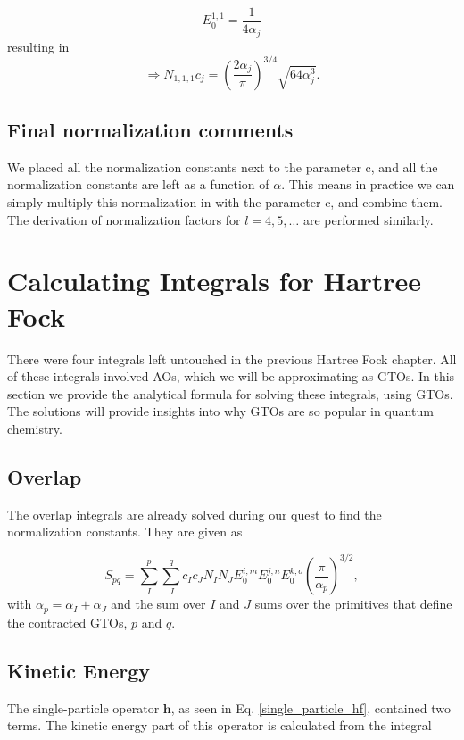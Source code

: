 \documentclass[a4paper,norsk,11pt,twoside]{report}
\begin{document}
\begin{equation}
E_0^{1,1} = \frac{1}{4\alpha_j}  
\end{equation}
resulting in
\begin{equation}
\Rightarrow N_{1,1,1} c_j = \left( \frac{2\alpha_j}{\pi} \right)^{3/4} \sqrt{64 \alpha_j^3} .
\end{equation}

\subsection{Final normalization comments}
We placed all the normalization constants  next to the parameter c, and all the normalization constants are left as a function of $\alpha$. This means in practice we can simply multiply this normalization in with the parameter c, and combine them. \\

The derivation of normalization factors for $l = 4, 5, \dots$ are performed similarly.

\section{Calculating Integrals for Hartree Fock}
There were four integrals left untouched in the previous Hartree Fock chapter. All of these integrals involved AOs, which we will be approximating as GTOs. In this section we  provide the analytical formula for solving these integrals, using GTOs. The solutions will provide insights into why GTOs are so popular in quantum chemistry. 

\subsection{Overlap}
The overlap integrals are already solved during our quest to find the normalization constants.
They are given as

\begin{equation}
S_{pq} = \sum_I^p \sum_J^q c_I c_J N_I N_J E_0^{i,m} E_0^{j,n} E_0^{k,o} \left( \frac{\pi}{\alpha_p} \right)^{3/2}  ,
\end{equation}
with $\alpha_p = \alpha_I + \alpha_J$ and the sum over $I$ and $J$ sums over
the primitives that define the contracted GTOs, $p$ and $q$.

\subsection{Kinetic Energy}
The single-particle operator $\textbf{h}$, as seen in Eq. \eqref{single_particle_hf}, contained two terms. The kinetic energy part of this operator is calculated from the integral
\end{document}
